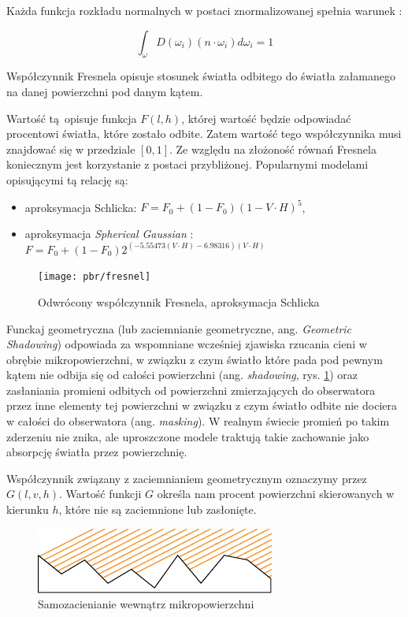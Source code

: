 \documentclass[../main.tex]{subfiles}
\begin{document}
Każda funkcja rozkładu normalnych w postaci znormalizowanej spełnia warunek
\cite{NDFReed}:

\[
  \int_{\omega} {
    D(\omega_i)
    (n \cdot \omega_i)
    d \omega_i
  } = 1
\]

Współczynnik Fresnela opisuje stosunek światła odbitego do światła załamanego
na danej powierzchni pod danym kątem.

Wartość tą opisuje funkcja $F(l,h)$, której wartość będzie odpowiadać
procentowi światła, które zostało odbite. Zatem wartość tego współczynnika musi
znajdować się w przedziale $[0,1]$. Ze względu na złożoność równań Fresnela
koniecznym jest korzystanie z postaci przybliżonej. Popularnymi modelami
opisującymi tą relację są:

\begin{itemize}
\item aproksymacja Schlicka: $F = F_0 + (1 - F_0)(1-V \cdot H)^5$,
\item aproksymacja \textit{Spherical Gaussian} \cite{SphericalGaussianLegarde}:
  $ F = F_0 +(1−F_0) 2^{
    \left(−5.55473\left(V \cdot H\right)−6.98316\right) (V \cdot H)
  } $
\end{itemize}

\begin{figure}[ht]
  \centering
  \texttt{[image: pbr/fresnel]}
  \caption{Odwrócony współczynnik Fresnela, aproksymacja Schlicka}
\end{figure}

Funckaj geometryczna (lub zaciemnianie geometryczne, ang. \textit{Geometric
Shadowing}) odpowiada za wspomniane wcześniej zjawiska rzucania cieni w obrębie
mikropowierzchni, w związku z czym światło które pada pod pewnym kątem nie
odbija się od całości powierzchni (ang. \textit{shadowing}, rys.
\ref{fig:GeometricShadowing}) oraz zasłaniania promieni odbitych od powierzchni
zmierzających do obserwatora przez inne elementy tej powierzchni w związku z
czym światło odbite nie dociera w całości do obserwatora (ang.
\textit{masking}). W realnym świecie promień po takim zderzeniu nie znika, ale
uproszczone modele traktują takie zachowanie jako absorpcję światła przez
powierzchnię.

Współczynnik związany z zaciemnianiem geometrycznym oznaczymy przez $G(l,v,h)$.
Wartość funkcji $G$ określa nam procent powierzchni skierowanych w kierunku
$h$, które nie są zaciemnione lub zasłonięte.

\begin{figure}[h]
  \centering
  \includegraphics{illustrations/pbr/geometry_shadowing.pdf}
  \vspace{0.25cm}
  \caption{Samozacienianie wewnątrz mikropowierzchni}
  \label{fig:GeometricShadowing}
\end{figure}
\end{document}
